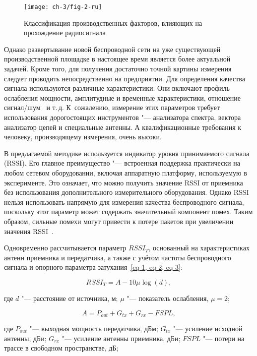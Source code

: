 \begin{figure*}[ht]
	\centering
	\texttt{[image: ch-3/fig-2-ru]}
	\caption{Классификация производственных факторов, влияющих на прохождение радиосигнала}
	\label{ch-3/fig-2}
\end{figure*}

Однако развертывание новой беспроводной сети на уже существующей производственной площадке в настоящее время является более актуальной задачей. Кроме того, для получения достаточно точной картины измерения следует проводить непосредственно на предприятии. Для определения качества сигнала используются различные характеристики. Они включают профиль ослабления мощности, амплитудные и временные характеристики, отношение сигнал/шум~\cite{6133782} и т.\,д. К~сожалению, измерение этих параметров требует использования дорогостоящих инструментов "--- анализатора спектра, вектора анализатор цепей и специальные антенны. А квалификационные требования к человеку, производящему измерения, очень высоки.

В предлагаемой методике используется индикатор уровня принимаемого сигнала (RSSI). Его главное преимущество "--- встроенная поддержка практически на любом сетевом оборудовании, включая аппаратную платформу, используемую в эксперименте. Это означает, что можно получить значение RSSI от приемника без использования дополнительного измерительного оборудования. Однако RSSI нельзя использовать напрямую для измерения качества беспроводного сигнала, поскольку этот параметр может содержать значительный компонент помех. Таким образом, сильные помехи могут привести к потере пакетов при увеличении значения RSSI~\cite{8211460}.

Одновременно рассчитывается параметр $RSSI_T$, основанный на характеристиках антенн приемника и передатчика, а также с учётом частоты беспроводного сигнала и опорного параметра затухания~\cref{eq-1, eq-2, eq-3}:

\begin{equation}
	RSSI_T = A-10 \mu\log (d),
	\label{eq-1}
\end{equation}

\noindent где $d$ "--- расстояние от источника, м; $\mu$ "--- показатель ослабления, $\mu = 2$;

\begin{equation}
	A = P_{out} + G_{tx} + G_{rx} -FSPL,
	\label{eq-2}
\end{equation}

\noindent где $P_{out}$ "--- выходная мощность передатчика, дБм; $G_{tx}$ "--- усиление исходной антенны, дБи; $G_{rx}$ "--- усиление антенны приемника, дБи; $FSPL$ "--- потери на трассе в свободном пространстве, дБ;

